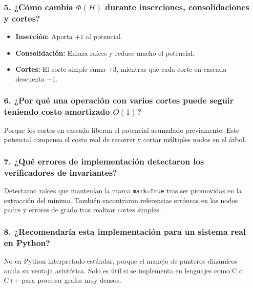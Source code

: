 \subsubsection*{5. ¿Cómo cambia $\Phi(H)$ durante inserciones, consolidaciones y cortes?}
\begin{itemize}
    \item \textbf{Inserción:} Aporta $+1$ al potencial.
    \item \textbf{Consolidación:} Enlaza raíces y reduce mucho el potencial.
    \item \textbf{Cortes:} El corte simple suma $+3$, mientras que cada corte en cascada descuenta $-1$.
\end{itemize}

\subsubsection*{6. ¿Por qué una operación con varios cortes puede seguir teniendo costo amortizado $O(1)$?}
Porque los cortes en cascada liberan el potencial acumulado previamente. Este potencial compensa el costo real de recorrer y cortar múltiples nodos en el árbol.

\subsubsection*{7. ¿Qué errores de implementación detectaron los verificadores de invariantes?}
Detectaron raíces que mantenían la marca \texttt{mark=True} tras ser promovidas en la extracción del mínimo. También encontraron referencias erróneas en los nodos padre y errores de grado tras realizar cortes simples.

\subsubsection*{8. ¿Recomendaría esta implementación para un sistema real en Python?}
No en Python interpretado estándar, porque el manejo de punteros dinámicos anula su ventaja asintótica. Solo es útil si se implementa en lenguajes como C o C++ para procesar grafos muy densos.
